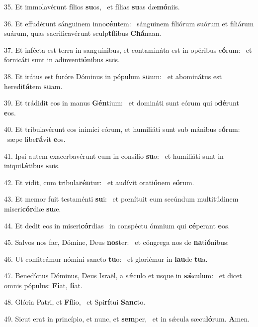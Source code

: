 35. Et immolavérunt fílios \textbf{su}os, \ast\  et fílias \textbf{su}as dæ\textbf{mó}niis.\

36. Et effudérunt sánguinem inno\textbf{cén}tem: \ast\  sánguinem filiórum suórum et filiárum suárum, quas sacrificavérunt sculp\textbf{tí}libus \textbf{Chá}naan.\

37. Et infécta est terra in sanguínibus, et contamináta est in opéribus e\textbf{ó}rum: \ast\  et fornicáti sunt in adinventi\textbf{ó}nibus \textbf{su}is.\

38. Et irátus est furóre Dóminus in pópulum \textbf{su}um: \ast\  et abominátus est heredi\textbf{tá}tem \textbf{su}am.\

39. Et trádidit eos in manus \textbf{Gén}tium: \ast\  et domináti sunt eórum qui o\textbf{dé}runt \textbf{e}os.\

40. Et tribulavérunt eos inimíci eórum, et humiliáti sunt sub mánibus e\textbf{ó}rum: \ast\  sæpe libe\textbf{rá}vit \textbf{e}os.\

41. Ipsi autem exacerbavérunt eum in consílio \textbf{su}o: \ast\  et humiliáti sunt in iniqui\textbf{tá}tibus \textbf{su}is.\

42. Et vidit, cum tribula\textbf{rén}tur: \ast\  et audívit orati\textbf{ó}nem e\textbf{ó}rum.\

43. Et memor fuit testaménti \textbf{su}i: \ast\  et pœnítuit eum secúndum multitúdinem miseri\textbf{cór}diæ \textbf{su}æ.\

44. Et dedit eos in miseri\textbf{cór}dias \ast\  in conspéctu ómnium qui \textbf{cé}perant \textbf{e}os.\

45. Salvos nos fac, Dómine, Deus \textbf{nos}ter: \ast\  et cóngrega nos de \textbf{na}ti\textbf{ó}nibus:\

46. Ut confiteámur nómini sancto \textbf{tu}o: \ast\  et gloriémur in \textbf{lau}de \textbf{tu}a.\

47. Benedíctus Dóminus, Deus Israël, a sǽculo et usque in \textbf{sǽ}culum: \ast\  et dicet omnis pópulus: \textbf{Fi}at, \textbf{fi}at.\

48. Glória Patri, et \textbf{Fí}lio, \ast\  et Spi\textbf{rí}tui \textbf{Sanc}to.\

49. Sicut erat in princípio, et nunc, et \textbf{sem}per, \ast\  et in sǽcula sæcu\textbf{ló}rum. \textbf{A}men.\


